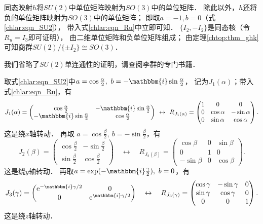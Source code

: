 同态映射$h$将$SU(2)$中单位矩阵映射为$SO(3)$中的单位矩阵．
除此以外，$h$还将负的单位矩阵映射为$SO(3)$中的单位矩阵；
即取$a=-1,b=0$（式\eqref{chlar:eqn_SU2}），
带入式\eqref{chlar:eqn_Ru}中立即可知．
$\{I_2,-I_2\}$是同态核（令$R_u = I_3$即可证明），
由二维单位矩阵和负单位矩阵组成；
由定理\ref{chtop:thm_ghk}可知商群$SU(2)/\{\pm I_2\}\cong SO(3)$．

我们省略了$SU(2)$单连通性的证明，请查阅李群的专门书籍．

取式\eqref{chlar:eqn_SU2}中$a=\cos \frac{\alpha}{2},\ b=-\mathbbm{i}\sin \frac{\alpha}{2}$，
记为$J_1({\alpha})$；带入式\eqref{chlar:eqn_Ru}，有
\begin{equation}\label{chlar:eqn_su2-x}
    J_1(\alpha)=\begin{pmatrix}
        \cos \frac{\alpha}{2} & -\mathbbm{i}\sin \frac{\alpha}{2} \\
        -\mathbbm{i}\sin \frac{\alpha}{2} & \cos \frac{\alpha}{2}
    \end{pmatrix}
    \ \leftrightarrow \
    R_{J_1(\alpha)}=\begin{pmatrix}
        1 & 0 & 0 \\
        0 & \cos \alpha &  -\sin \alpha \\
        0 & \sin \alpha &  \cos \alpha
    \end{pmatrix} .
\end{equation}
这是绕$x$轴转动．
再取 $a=\cos \frac{\beta}{2},\ b=-\sin \frac{\beta}{2}$，有
\begin{equation}\label{chlar:eqn_su2-y}
    J_2(\beta)=\begin{pmatrix}
        \cos \frac{\beta}{2} & -\sin \frac{\beta}{2} \\
        \sin \frac{\beta}{2} & \cos \frac{\beta}{2}
    \end{pmatrix}
    \quad \leftrightarrow \quad
    R_{J_2(\beta)}=\begin{pmatrix}
        \cos \beta & 0 & \sin \beta \\
        0 & 1 & 0 \\
        -\sin \beta & 0 & \cos \beta
    \end{pmatrix} .
\end{equation}
这是绕$y$轴转动．
再取$a=\exp(-\mathbbm{i}\frac{\gamma}{2}),\ b=0$，有
\begin{equation}\label{chlar:eqn_su2-z}
    J_3(\gamma)= \begin{pmatrix}
        \mathrm{e}^{-\mathbbm{i} \gamma / 2} & 0 \\
        0 & \mathrm{e}^{\mathbbm{i} \gamma / 2}
    \end{pmatrix}
    \quad \leftrightarrow \quad
    R_{J_3(\gamma)}=\begin{pmatrix}
        \cos \gamma & -\sin \gamma & 0 \\
        \sin \gamma & \cos \gamma & 0 \\
        0 & 0 & 1
    \end{pmatrix} .
\end{equation}
这是绕$z$轴转动．



